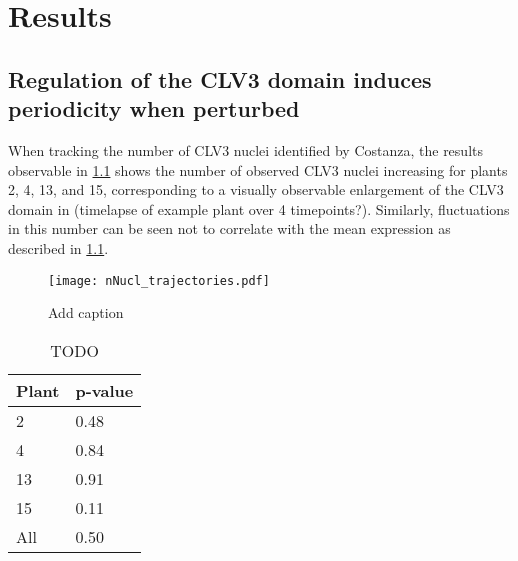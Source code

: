 
\chapter{Results}

\ifpdf
    \graphicspath{{Chapter3/Figs/Raster/}{Chapter3/Figs/PDF/}{Chapter3/Figs/}}
\else
    \graphicspath{{Chapter3/Figs/Vector/}{Chapter3/Figs/}}
\fi

\section{Regulation of the CLV3 domain induces periodicity when perturbed}
When tracking the number of CLV3 nuclei identified by Costanza, the results
observable in \cref{fig:clv3_trajs} shows the number of observed CLV3 nuclei
increasing for plants 2, 4, 13, and 15, corresponding to a visually observable
enlargement of the CLV3 domain in \FIG (timelapse of example plant over 4
timepoints?). Similarly, fluctuations in this number can be seen not to 
correlate with the mean expression as described in
\cref{tab:corr_nNucl_meanExpr}. %

\begin{figure}[H]
  \centering
  \texttt{[image: nNucl\_trajectories.pdf]}
  \caption{Add caption}
  \label{fig:clv3_trajs}
\end{figure}

\begin{table}
  \centering
  \caption{TODO}
  \label{tab:corr_nNucl_meanExpr}
  \begin{tabular}{ll}  \toprule
    Plant & p-value \\ \midrule
    2     & 0.48    \\
    4     & 0.84    \\
    13    & 0.91    \\
    15    & 0.11    \\ \midrule
    All   & 0.50    \\ \bottomrule
  \end{tabular}
\end{table}


